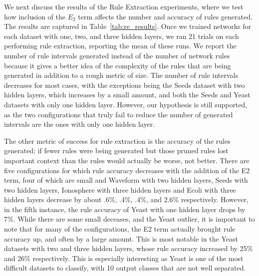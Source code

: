 We next discuss the results of the Rule Extraction experiments,
where we test how inclusion of the $E_2$ term affects the number
and accuracy of rules generated.
The results are
captured in Table~\ref{tab:re_results}.
Once we trained networks for each dataset with
one, two, and three hidden layers, we ran 21 trials on each performing
rule extraction, reporting the mean of these runs. We report the
number of rule intervals generated instead of the number of network
rules because it gives a better idea of the complexity of the rules
that are being generated in addition to a rough metric of size. The
number of rule intervals decreases for most cases, with the exceptions
being the Seeds dataset with two hidden layers, which increases by a
small amount, and both the Seeds and Yeast datasets with only one
hidden layer. However, our hypothesis is
still supported, as the two configurations that truly fail to reduce
the number of generated intervals are the ones with only one hidden
layer. 

The other metric of success for rule extraction is the accuracy of the rules generated; if fewer rules were being generated but those pruned rules lost important context than the rules would actually be worse, not better. There are five configurations for which rule accuracy decreases with the addition of the E2 term, four of which are small and Waveform with two hidden layers, Seeds with two hidden layers, Ionosphere with three hidden layers and Ecoli with three hidden layers decrease by about .6\%, .4\%, .4\%, and 2.6\% respectively. However, in the fifth instance, the rule accuracy of Yeast with one hidden layer drops by 7\%. While there are some small deceases, and the Yeast outlier, it is important to note that for many of the configurations, the E2 term actually brought rule accuracy up, and often by a large amount. This is most notable in the Yeast datasets with two and three hidden layers, whose rule accuracy increased by 25\% and 26\% respectively. This is especially interesting as Yeast is one of the most difficult datasets to classify, with 10 output classes that are not well separated. 

